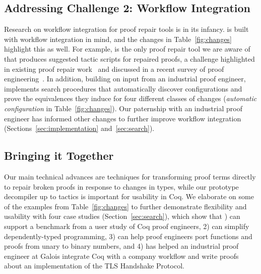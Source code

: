 \subsection*{Addressing Challenge 2: Workflow Integration}

Research on workflow integration for proof repair tools is in its infancy.
\toolname is built with workflow integration in mind, and the changes in Table~\ref{fig:changes} highlight this as well.
For example, \toolname is the only proof repair tool we are aware of that produces suggested tactic scripts for repaired proofs,
a challenge highlighted in existing proof repair work~\cite{pumpkinpatch, robert2018} and discussed in 
a recent survey of proof engineering~\cite{PGL-045}.
In addition, building on input from an industrial proof engineer, \toolname implements search procedures that 
automatically discover configurations and prove the equivalences they induce for four different classes of 
changes (\textit{automatic configuration} in Table~\ref{fig:changes}).
Our paternship with an industrial proof engineer has informed other changes to further improve workflow integration
(Sections~\ref{sec:implementation} and~\ref{sec:search}).

\subsection*{Bringing it Together}

Our main technical advances are techniques for transforming proof terms directly to repair broken proofs in response to changes
in types, while our prototype decompiler up to tactics is important for usability in Coq.
We elaborate on some of the examples from Table~\ref{fig:changes} to further demonstrate flexibility and usability with four case studies (Section~\ref{sec:search}), which show that ) can support a benchmark from a user study of Coq proof engineers, 2) can simplify dependently-typed programming, %
3) can help proof engineers port functions and proofs from unary to binary numbers, and
4) has helped an industrial proof engineer at Galois integrate Coq with a company workflow and write proofs about an implementation of the TLS Handshake Protocol.

